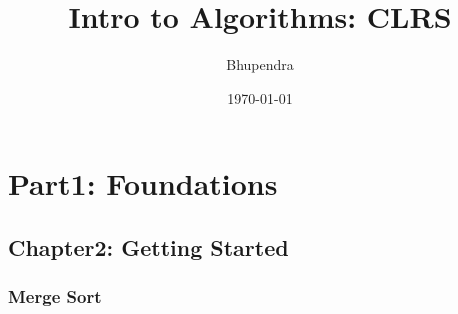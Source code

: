 \documentclass[11pt]{article}
\author{Bhupendra}
\date{\today}
\title{Intro to Algorithms: CLRS}
\begin{document}
\maketitle
\tableofcontents


\section{Part1: Foundations}
\label{sec:orgee23445}

\subsection{Chapter2: Getting Started}
\label{sec:orgb370f73}
\subsubsection{Merge Sort}
\label{sec:orge60101e}
\end{document}
